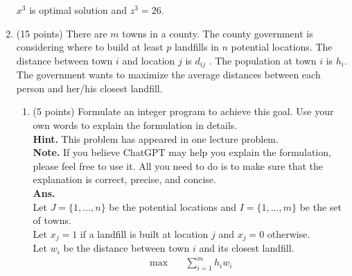 \documentclass[12pt]{article}
\begin{document}
\begin{enumerate}
\begin{enumerate}
            \end{enumerate}
            $x^3$ is optimal solution and $z^3 = 26$.
      \item (15 points) There are $m$ towns in a county. The county government is considering where to build at least $p$ landfills in $n$ potential locations. The distance between town $i$ and location $j$ is $d_{ij}$ . The population at town $i$ is $h_i$. The government wants to maximize the average distances between each person and her/his closest landfill.
            \begin{enumerate}
                  \item (5 points) Formulate an integer program to achieve this goal. Use your own words to explain the formulation in details.\\
                        \textbf{Hint.} This problem has appeared in one lecture problem.\\
                        \textbf{Note.} If you believe ChatGPT may help you explain the formulation, please feel free to use it. All you need to do is to make sure that the explanation is correct, precise, and concise.\\
                        \textbf{Ans.}\\
                        Let $J =\{1,\dots,n\}$ be the potential locations and $I = \{1,\dots, m\}$ be the set of towns.\\
                        Let $x_j = 1$ if a landfill is built at location $j$ and $x_j = 0$ otherwise.\\
                        Let $w_i$ be the distance between town $i$ and its closest landfill.
                        \begin{align}
                              \max \quad       & \sum_{i=1}^m h_iw_i                                           \\

\end{align}
\end{enumerate}
\end{enumerate}
\end{document}
